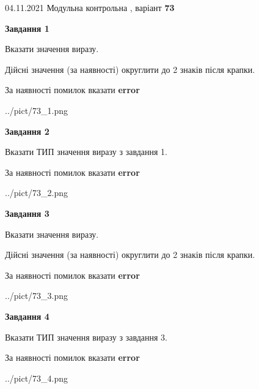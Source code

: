 \documentclass[11pt, ukrainian]{article}
\begin{document}
{04.11.2021 Модульна контрольна , варіант  \No \textbf { 73 }\par}
{
\begin {large}
{\begin {center}\textbf{Завдання 1}\end {center}}\par
Вказати значення виразу. \par
Дійсні значення (за наявності) округлити до 2 знаків після крапки. \par
За наявності помилок вказати \textbf{error}

\begin{center}
	{../pict/73_1.png}
\end{center}
\newpage

{\begin {center}\textbf{Завдання 2}\end {center}}\par
Вказати ТИП значення виразу з завдання 1. \par
За наявності помилок вказати \textbf{error}

\begin{center}
	{../pict/73_2.png}
\end{center}
\newpage

{\begin {center}\textbf{Завдання 3}\end {center}}\par
Вказати значення виразу. \par
Дійсні значення (за наявності) округлити до 2 знаків після крапки. \par
За наявності помилок вказати \textbf{error}

\begin{center}
	{../pict/73_3.png}
\end{center}
\newpage

{\begin {center}\textbf{Завдання 4}\end {center}}\par
Вказати ТИП значення виразу з завдання 3. \par
За наявності помилок вказати \textbf{error}

\begin{center}
	{../pict/73_4.png}
\end{center}
\newpage


\end{large}}
\end{document}
